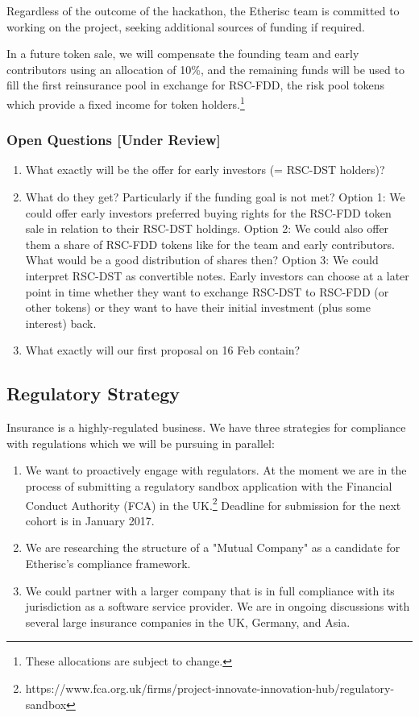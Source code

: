 \documentclass[12pt]{article}
\begin{document}
Regardless of the outcome of the hackathon, the Etherisc team is committed to working on the project, seeking additional sources of funding if required. 

In a future token sale, we will compensate the founding team and early contributors using an allocation of 10\%, and the remaining funds will be used to fill the first reinsurance pool in exchange for RSC-FDD, the risk pool tokens which provide a fixed income for token holders.\footnote{These allocations are subject to change.}

\subsubsection{Open Questions [Under Review]}

\begin{enumerate}
    \item What exactly will be the offer for early investors (= RSC-DST holders)? 
    \item What do they get? Particularly if the funding goal is not met? Option 1: We could offer early investors preferred buying rights for the RSC-FDD token sale in relation to their RSC-DST holdings. Option 2: We could also offer them a share of RSC-FDD tokens like for the team and early contributors. What would be a good distribution of shares then? Option 3: We could interpret RSC-DST as convertible notes. Early investors can choose at a later point in time whether they want to exchange RSC-DST to RSC-FDD (or other tokens) or they want to have their initial investment (plus some interest) back.
    \item What exactly will our first proposal on 16 Feb contain?
\end{enumerate}

\subsection{Regulatory Strategy}

Insurance is a highly-regulated business. We have three strategies for compliance with regulations which we will be pursuing in parallel:

\begin{enumerate}
    \item We want to proactively engage with regulators. At the moment we are in the process of submitting a regulatory sandbox application with the Financial Conduct Authority (FCA) in the UK.\footnote{ https://www.fca.org.uk/firms/project-innovate-innovation-hub/regulatory-sandbox} Deadline for submission for the next cohort is in January 2017.
    \item We are researching the structure of a "Mutual Company" as a candidate for Etherisc's compliance framework.
    \item We could partner with a larger company that is in full compliance with its jurisdiction as a software service provider. We are in ongoing discussions with several large insurance companies in the UK, Germany, and Asia.
\end{enumerate}
\end{document}
